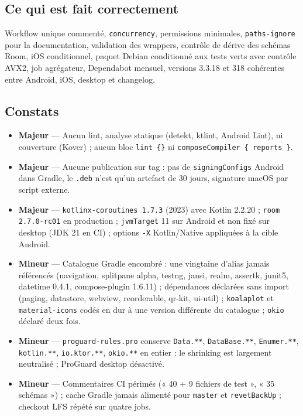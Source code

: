 \documentclass[11pt,a4paper]{article}
\newcommand{\fichier}[1]{\texttt{\small #1}}
\newcommand{\code}[1]{\texttt{#1}}
\newcommand{\sev}[1]{\textbf{#1}}
\begin{document}
\subsection*{Ce qui est fait correctement}

Workflow unique commenté, \code{concurrency}, permissions minimales, \code{paths-ignore} pour la
documentation, validation des wrappers, contrôle de dérive des schémas Room, iOS conditionnel,
paquet Debian conditionné aux tests verts avec contrôle AVX2, job agrégateur, Dependabot mensuel,
versions 3.3.18 et 318 cohérentes entre Android, iOS, desktop et changelog.

\subsection*{Constats}

\begin{itemize}
\item \sev{Majeur} --- Aucun lint, analyse statique (detekt, ktlint, Android Lint), ni couverture
  (Kover) ; aucun bloc \code{lint \{\}} ni \code{composeCompiler \{ reports \}}.
\item \sev{Majeur} --- Aucune publication sur tag : pas de \code{signingConfigs} Android dans Gradle,
  le \code{.deb} n'est qu'un artefact de 30 jours, signature macOS par script externe.
\item \sev{Majeur} --- \code{kotlinx-coroutines 1.7.3} (2023) avec Kotlin 2.2.20 ;
  \code{room 2.7.0-rc01} en production ; \code{jvmTarget} 11 sur Android et non fixé sur desktop
  (JDK 21 en CI) ; options \code{-X} Kotlin/Native appliquées à la cible Android.
\item \sev{Mineur} --- Catalogue Gradle encombré : une vingtaine d'alias jamais référencés
  (navigation, splitpane alpha, testng, jansi, realm, assertk, junit5, datetime 0.4.1,
  compose-plugin 1.6.11) ; dépendances déclarées sans import (paging, datastore, webview,
  reorderable, qr-kit, ui-util) ; \code{koalaplot} et \code{material-icons} codés en dur à une
  version différente du catalogue ; \code{okio} déclaré deux fois.
\item \sev{Mineur} --- \fichier{proguard-rules.pro} conserve \code{Data.**}, \code{DataBase.**},
  \code{Enumer.**}, \code{kotlin.**}, \code{io.ktor.**}, \code{okio.**} en entier : le shrinking
  est largement neutralisé ; ProGuard desktop désactivé.
\item \sev{Mineur} --- Commentaires CI périmés (« 40 + 9 fichiers de test », « 35 schémas ») ;
  cache Gradle jamais alimenté pour \code{master} et \code{revetBackUp} ; checkout LFS répété sur
  quatre jobs.
\end{itemize}
\end{document}
